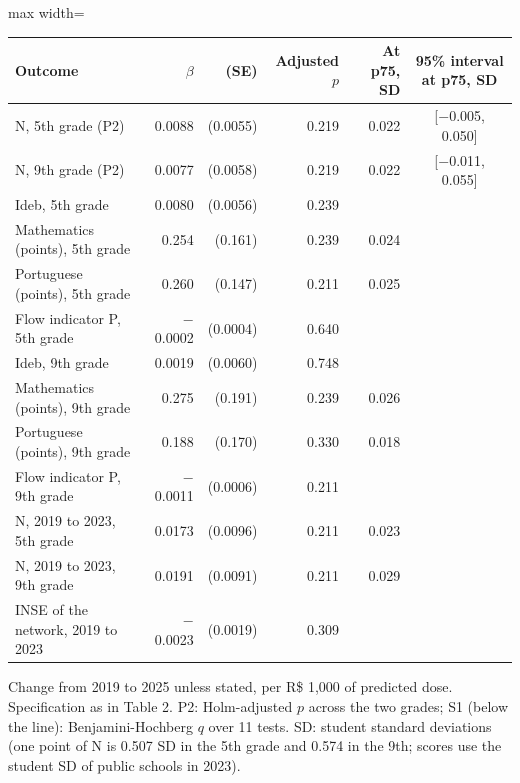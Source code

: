 \begin{adjustbox}{max width=\linewidth}
\begin{tabular}{lrrrrc}
\toprule
Outcome & $\beta$ & (SE) & Adjusted $p$ & At p75, SD & 95\% interval at p75, SD \\
\midrule
N, 5th grade (P2) & 0.0088 & (0.0055) & 0.219 & 0.022 & [$-$0.005, 0.050] \\
N, 9th grade (P2) & 0.0077 & (0.0058) & 0.219 & 0.022 & [$-$0.011, 0.055] \\
\midrule
Ideb, 5th grade & 0.0080 & (0.0056) & 0.239 &  & \\
Mathematics (points), 5th grade & 0.254 & (0.161) & 0.239 & 0.024 & \\
Portuguese (points), 5th grade & 0.260 & (0.147) & 0.211 & 0.025 & \\
Flow indicator P, 5th grade & $-$0.0002 & (0.0004) & 0.640 &  & \\
Ideb, 9th grade & 0.0019 & (0.0060) & 0.748 &  & \\
Mathematics (points), 9th grade & 0.275 & (0.191) & 0.239 & 0.026 & \\
Portuguese (points), 9th grade & 0.188 & (0.170) & 0.330 & 0.018 & \\
Flow indicator P, 9th grade & $-$0.0011 & (0.0006) & 0.211 &  & \\
N, 2019 to 2023, 5th grade & 0.0173 & (0.0096) & 0.211 & 0.023 & \\
N, 2019 to 2023, 9th grade & 0.0191 & (0.0091) & 0.211 & 0.029 & \\
INSE of the network, 2019 to 2023 & $-$0.0023 & (0.0019) & 0.309 &  & \\
\bottomrule
\end{tabular}
\end{adjustbox}
\par\smallskip\begin{minipage}{0.95\linewidth}\footnotesize Change from 2019 to 2025 unless stated, per R\$ 1,000 of predicted dose. Specification as in Table 2. P2: Holm-adjusted $p$ across the two grades; S1 (below the line): Benjamini-Hochberg $q$ over 11 tests. SD: student standard deviations (one point of N is 0.507 SD in the 5th grade and 0.574 in the 9th; scores use the student SD of public schools in 2023).\end{minipage}
